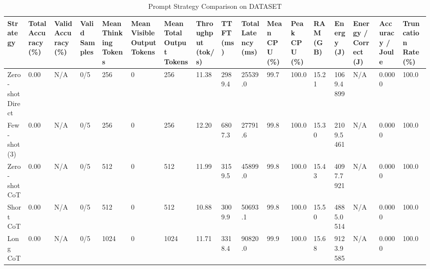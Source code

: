 \begin{table}
\caption{Prompt Strategy Comparison on DATASET}
\label{tab:strategy_comparison}
\begin{tabular}{lllllllllllllllll}
\toprule
Strategy & Total Accuracy (\%) & Valid Accuracy (\%) & Valid Samples & Mean Thinking Tokens & Mean Visible Output Tokens & Mean Total Output Tokens & Throughput (tok/s) & TTFT (ms) & Total Latency (ms) & Mean CPU (\%) & Peak CPU (\%) & RAM (GB) & Energy (J) & Energy / Correct (J) & Accuracy / Joule & Truncation Rate (\%) \\
\midrule
Zero-shot Direct & 0.00 & N/A & 0/5 & 256 & 0 & 256 & 11.38 & 2989.4 & 25539.0 & 99.7 & 100.0 & 15.21 & 1069.4899 & N/A & 0.0000 & 100.0 \\
Few-shot (3) & 0.00 & N/A & 0/5 & 256 & 0 & 256 & 12.20 & 6807.3 & 27791.6 & 99.8 & 100.0 & 15.30 & 2109.5461 & N/A & 0.0000 & 100.0 \\
Zero-shot CoT & 0.00 & N/A & 0/5 & 512 & 0 & 512 & 11.99 & 3159.5 & 45899.0 & 99.8 & 100.0 & 15.43 & 4097.7921 & N/A & 0.0000 & 100.0 \\
Short CoT & 0.00 & N/A & 0/5 & 512 & 0 & 512 & 10.88 & 3009.9 & 50693.1 & 99.8 & 100.0 & 15.50 & 4885.0514 & N/A & 0.0000 & 100.0 \\
Long CoT & 0.00 & N/A & 0/5 & 1024 & 0 & 1024 & 11.71 & 3318.4 & 90820.0 & 99.9 & 100.0 & 15.68 & 9123.9585 & N/A & 0.0000 & 100.0 \\
\bottomrule
\end{tabular}
\end{table}
